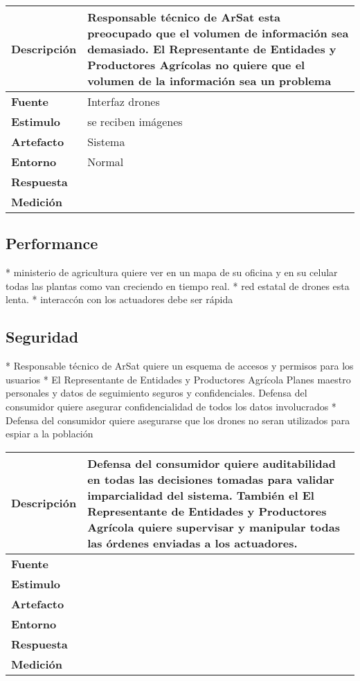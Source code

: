 \begin{tabular}{| l || p{12cm} |}
\hline 
\textbf{Descripci\'on} & Responsable t\'ecnico de ArSat esta preocupado que el volumen de informaci\'on sea demasiado. El Representante de Entidades y Productores Agr\'icolas no quiere que el volumen de la informaci\'on sea un problema\\
\hline 
\textbf{Fuente} & Interfaz drones\\
\hline 
\textbf{Estimulo} & se reciben im\'agenes\\
\hline 
\textbf{Artefacto} & Sistema\\
\hline 
\textbf{Entorno} & Normal\\
\hline 
\textbf{Respuesta} & \\
\hline 
\textbf{Medici\'on} & \\
\hline 
\end{tabular}

\subsection{Performance}

* ministerio de agricultura quiere ver en un mapa de su oficina y en su celular todas las plantas como van creciendo en tiempo real.
* red estatal de drones esta lenta.
* interacc\'on con los actuadores debe ser r\'apida

\subsection{Seguridad}

* Responsable t\'ecnico de ArSat quiere un esquema de accesos y permisos para los usuarios
* El Representante de Entidades y Productores Agr\'icola Planes maestro personales y datos de seguimiento seguros y confidenciales. Defensa del consumidor quiere asegurar confidencialidad de todos los datos involucrados
* Defensa del consumidor quiere asegurarse que los drones no seran utilizados para espiar a la poblaci\'on


\begin{tabular}{| l || p{12cm} |}
\hline 
\textbf{Descripci\'on} & Defensa del consumidor quiere auditabilidad en todas las decisiones tomadas para validar imparcialidad del sistema. Tambi\'en el El Representante de Entidades y Productores Agr\'icola quiere supervisar y manipular todas las \'ordenes enviadas a los actuadores. \\
\hline 
\textbf{Fuente} & \\
\hline 
\textbf{Estimulo} & \\
\hline 
\textbf{Artefacto} & \\
\hline 
\textbf{Entorno} & \\
\hline 
\textbf{Respuesta} & \\
\hline 
\textbf{Medici\'on} & \\
\hline 
\end{tabular}

